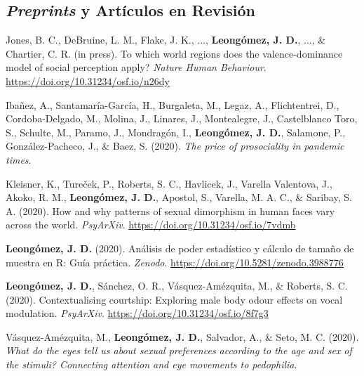 \documentclass[11pt, a4paper]{awesome-cv}
\begin{document}
\hypertarget{preprints-y-artuxedculos-en-revisiuxf3n}{%
\subsection{\texorpdfstring{\emph{Preprints} y Artículos en
Revisión}{Preprints y Artículos en Revisión}}\label{preprints-y-artuxedculos-en-revisiuxf3n}}

\begingroup
\setlength{\parindent}{-0.5in}
\setlength{\leftskip}{0.5in}

\hypertarget{refs_working_paper}{}
\leavevmode\hypertarget{ref-Jones2018}{}%
Jones, B. C., DeBruine, L. M., Flake, J. K., ...,
\textbf{Leongómez, J. D.}, ..., \& Chartier, C. R. (in press). {To which
world regions does the valence-dominance model of social perception
apply?} \emph{Nature Human Behaviour}.
\url{https://doi.org/10.31234/osf.io/n26dy}

\leavevmode\hypertarget{ref-Inanez2020}{}%
Ibañez, A., Santamaría-García, H., Burgaleta, M., Legaz, A.,
Flichtentrei, D., Cordoba-Delgado, M., Molina, J., Linares, J.,
Montealegre, J., Castelblanco Toro, S., Schulte, M., Paramo, J.,
Mondragón, I., \textbf{Leongómez, J. D.}, Salamone, P.,
González-Pacheco, J., \& Baez, S. (2020). \emph{{The price of
prosociality in pandemic times}}.

\leavevmode\hypertarget{ref-Kleisner2020}{}%
Kleisner, K., Tureček, P., Roberts, S. C., Havlicek, J., Varella
Valentova, J., Akoko, R. M., \textbf{Leongómez, J. D.}, Apostol, S.,
Varella, M. A. C., \& Saribay, S. A. (2020). {How and why patterns of
sexual dimorphism in human faces vary across the world}.
\emph{PsyArXiv}. \url{https://doi.org/10.31234/osf.io/7vdmb}

\leavevmode\hypertarget{ref-Leongomez2020a}{}%
\textbf{Leongómez, J. D.} (2020). {Análisis de poder estadístico y
cálculo de tamaño de muestra en R: Guía práctica}. \emph{Zenodo}.
\url{https://doi.org/10.5281/zenodo.3988776}

\leavevmode\hypertarget{ref-Leongomez2020}{}%
\textbf{Leongómez, J. D.}, Sánchez, O. R., Vásquez-Amézquita, M., \&
Roberts, S. C. (2020). Contextualising courtship: Exploring male body
odour effects on vocal modulation. \emph{PsyArXiv}.
\url{https://doi.org/10.31234/osf.io/8f7g3}

\leavevmode\hypertarget{ref-Vasquez2021}{}%
Vásquez-Amézquita, M., \textbf{Leongómez, J. D.}, Salvador, A., \& Seto,
M. C. (2020). \emph{{What do the eyes tell us about sexual preferences
according to the age and sex of the stimuli? Connecting attention and
eye movements to pedophilia}}.
\end{document}
